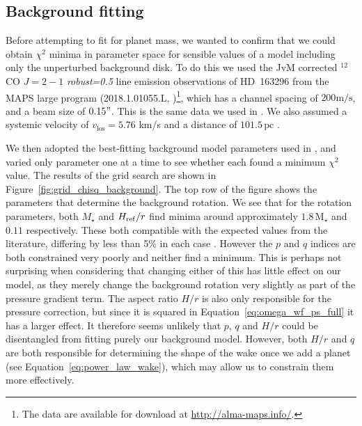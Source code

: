 \subsection{Background fitting}

Before attempting to fit for planet mass, we wanted to confirm that we could obtain $\chi^2$ minima in parameter space for sensible values of a model including only the unperturbed background disk.
To do this we used the JvM corrected \citep{jorsater1995} $^{12}$CO $J=2-1$ \textit{robust=0.5} line emission observations of HD~163296 from the MAPS large program (2018.1.01055.L, \citealt{oberg2021,czekala2021})\footnote{The data are available for download at \url{http://alma-maps.info/}.}, which has a channel spacing of $200 \mathrm{m/s}$, and a beam size of $0.15"$.
This is the same data we used in \citet{calcino2022}.
We also assumed a systemic velocity of $v_{\textrm{los}}= 5.76$ km/s \citep{teague2021} and a distance of $101.5 \, \mathrm{pc}$ \citep{gaiacollaboration2018}.

We then adopted the best-fitting background model parameters used in \citep{calcino2022}, and varied only parameter one at a time to see whether each found a minimum $\chi^2$ value.
The results of the grid search are shown in Figure~\ref{fig:grid_chisq_background}.
The top row of the figure shows the parameters that determine the background rotation.
We see that for the rotation parameters, both $M_\star$ and $H_{\rm ref}/r$ find minima around approximately $1.8 \, \mathrm{M_\star}$ and $0.11$ respectively. 
These both compatible with the expected values from the literature, differing by less than 5\% in each case \citep{pinte2018a}.
However the $p$ and $q$ indices are both constrained very poorly and neither find a minimum.
This is perhaps not surprising when considering that changing either of this has little effect on our model, as they merely change the background rotation very slightly as part of the pressure gradient term.
The aspect ratio $H/r$ is also only responsible for the pressure correction, but since it is squared in Equation~\eqref{eq:omega_wf_ps_full} it has a larger effect.
It therefore seems unlikely that $p$, $q$ and $H/r$ could be disentangled from fitting purely our background model.
However, both $H/r$ and $q$ are both responsible for determining the shape of the wake once we add a planet (see Equation~\ref{eq:power_law_wake}), which may allow us to constrain them more effectively.

